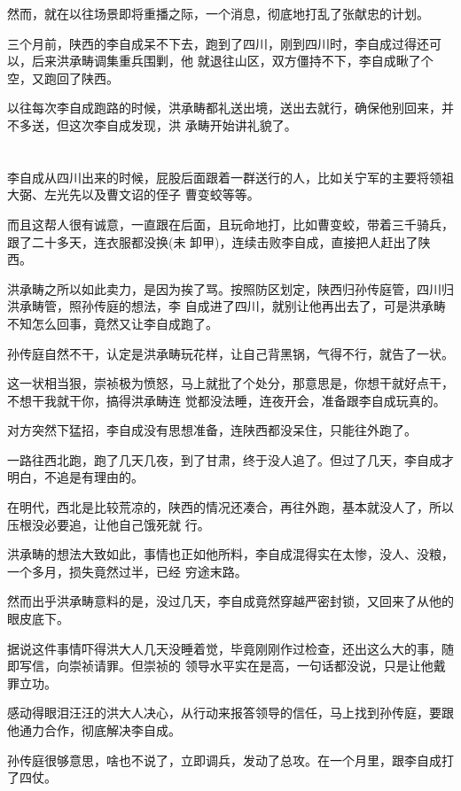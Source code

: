 \documentclass[11pt,a4paper,onecolumn]{article}
\begin{document}
然而，就在以往场景即将重播之际，一个消息，彻底地打乱了张献忠的计划。

三个月前，陕西的李自成呆不下去，跑到了四川，刚到四川时，李自成过得还可以，后来洪承畴调集重兵围剿，他
就退往山区，双方僵持不下，李自成瞅了个空，又跑回了陕西。

以往每次李自成跑路的时候，洪承畴都礼送出境，送出去就行，确保他别回来，并不多送，但这次李自成发现，洪
承畴开始讲礼貌了。

\section[\thesection]{}

李自成从四川出来的时候，屁股后面跟着一群送行的人，比如关宁军的主要将领祖大弼、左光先以及曹文诏的侄子
曹变蛟等等。

而且这帮人很有诚意，一直跟在后面，且玩命地打，比如曹变蛟，带着三千骑兵，跟了二十多天，连衣服都没换(未
卸甲)，连续击败李自成，直接把人赶出了陕西。

洪承畴之所以如此卖力，是因为挨了骂。按照防区划定，陕西归孙传庭管，四川归洪承畴管，照孙传庭的想法，李
自成进了四川，就别让他再出去了，可是洪承畴不知怎么回事，竟然又让李自成跑了。

孙传庭自然不干，认定是洪承畴玩花样，让自己背黑锅，气得不行，就告了一状。

这一状相当狠，崇祯极为愤怒，马上就批了个处分，那意思是，你想干就好点干，不想干我就干你，搞得洪承畴连
觉都没法睡，连夜开会，准备跟李自成玩真的。

对方突然下猛招，李自成没有思想准备，连陕西都没呆住，只能往外跑了。

一路往西北跑，跑了几天几夜，到了甘肃，终于没人追了。但过了几天，李自成才明白，不追是有理由的。

在明代，西北是比较荒凉的，陕西的情况还凑合，再往外跑，基本就没人了，所以压根没必要追，让他自己饿死就
行。

洪承畴的想法大致如此，事情也正如他所料，李自成混得实在太惨，没人、没粮，一个多月，损失竟然过半，已经
穷途末路。

然而出乎洪承畴意料的是，没过几天，李自成竟然穿越严密封锁，又回来了\myrule 从他的眼皮底下。

据说这件事情吓得洪大人几天没睡着觉，毕竟刚刚作过检查，还出这么大的事，随即写信，向崇祯请罪。但崇祯的
领导水平实在是高，一句话都没说，只是让他戴罪立功。

感动得眼泪汪汪的洪大人决心，从行动来报答领导的信任，马上找到孙传庭，要跟他通力合作，彻底解决李自成。

孙传庭很够意思，啥也不说了，立即调兵，发动了总攻。在一个月里，跟李自成打了四仗。
\end{document}
